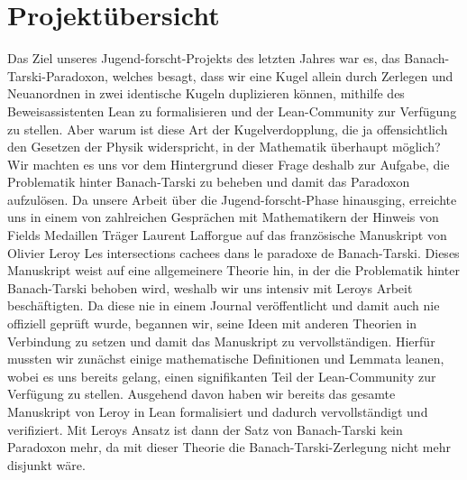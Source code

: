\documentclass[hidelinks]{article}
\begin{document}
    \section*{Projektübersicht}
    Das Ziel unseres Jugend-forscht-Projekts des letzten Jahres war es, das Banach-Tarski-Paradoxon, welches besagt, dass wir eine Kugel allein durch Zerlegen und Neuanordnen in zwei identische Kugeln duplizieren können, mithilfe des Beweisassistenten Lean zu formalisieren und der Lean-Community zur Verfügung zu stellen. Aber warum ist diese Art der Kugelverdopplung, die ja offensichtlich den Gesetzen der Physik widerspricht, in der Mathematik überhaupt möglich? Wir machten es uns vor dem Hintergrund dieser Frage deshalb zur Aufgabe, die Problematik hinter Banach-Tarski zu beheben und damit das Paradoxon aufzulösen. Da unsere Arbeit über die Jugend-forscht-Phase hinausging, erreichte uns in einem von zahlreichen Gesprächen mit Mathematikern der Hinweis von Fields Medaillen Träger Laurent Lafforgue auf das französische Manuskript von Olivier Leroy \glqq Les intersections cachees dans le paradoxe de Banach-Tarski\grqq. Dieses Manuskript weist auf eine allgemeinere Theorie hin, in der die Problematik hinter Banach-Tarski behoben wird, weshalb wir uns intensiv mit Leroys Arbeit beschäftigten. Da diese nie in einem Journal veröffentlicht und damit auch nie offiziell geprüft wurde, begannen wir, seine Ideen mit anderen Theorien in Verbindung zu setzen und damit das Manuskript zu vervollständigen. Hierfür mussten wir zunächst einige mathematische Definitionen und Lemmata leanen, wobei es uns bereits gelang, einen signifikanten Teil der Lean-Community zur Verfügung zu stellen. Ausgehend davon haben wir bereits das gesamte Manuskript von Leroy in Lean formalisiert und dadurch vervollständigt und verifiziert. Mit Leroys Ansatz ist dann der Satz von Banach-Tarski kein Paradoxon mehr, da mit dieser Theorie die Banach-Tarski-Zerlegung nicht mehr disjunkt wäre.



    \thispagestyle{empty}

    \clearpage
    \tableofcontents
    \listoffigures
    \thispagestyle{empty}

    \clearpage
    \setcounter{page}{1}
\end{document}
